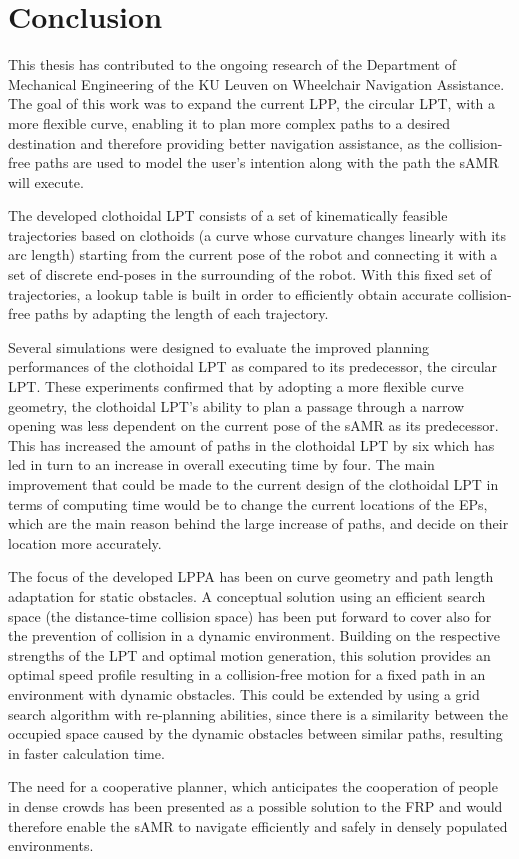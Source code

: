 \chapter{Conclusion} \label{cha:Concl}
This thesis has contributed to the ongoing research of the Department of Mechanical Engineering of the KU Leuven on Wheelchair Navigation Assistance. The goal of this work was to expand the current LPP, the circular LPT, with a more flexible curve, enabling it to plan more complex paths to a desired destination and therefore providing better navigation assistance, as the collision-free paths are used to model the user's intention along with the path the sAMR will execute.

The developed clothoidal LPT consists of a set of kinematically feasible trajectories based on clothoids (a curve whose curvature changes linearly with its arc length) starting from the current pose of the robot and connecting it with a set of discrete end-poses in the surrounding of the robot. With this fixed set of trajectories, a lookup table is built in order to efficiently obtain accurate collision-free paths by adapting the length of each trajectory.

Several simulations were designed to evaluate the improved planning performances of the clothoidal LPT as compared to its predecessor, the circular LPT. These experiments confirmed that by adopting a more flexible curve geometry, the clothoidal LPT’s ability to plan a passage through a narrow opening was less dependent on the current pose of the sAMR as its predecessor.  This has increased the amount of paths in the clothoidal LPT by six which has led in turn to an increase in overall executing time by four. The main improvement that could be made to the current design of the clothoidal LPT in terms of computing time would be to change the current locations of the EPs, which are the main reason behind the large increase of paths, and decide on their location more accurately.

The focus of the developed LPPA has been on curve geometry and path length adaptation for static obstacles. A conceptual solution using an efficient search space (the distance-time collision space) has been put forward to cover also for the prevention of collision in a dynamic environment. Building on the respective strengths of the LPT and optimal motion generation, this solution provides an optimal speed profile resulting in a collision-free motion for a fixed path in an environment with dynamic obstacles. This could be extended by using a grid search algorithm with re-planning abilities, since there is a similarity between the occupied space caused by the dynamic obstacles between similar paths, resulting in faster calculation time.

The need for a cooperative planner, which anticipates the cooperation of people in dense crowds has been presented as a possible solution to the FRP and would therefore enable the sAMR to navigate efficiently and safely in densely populated environments.

